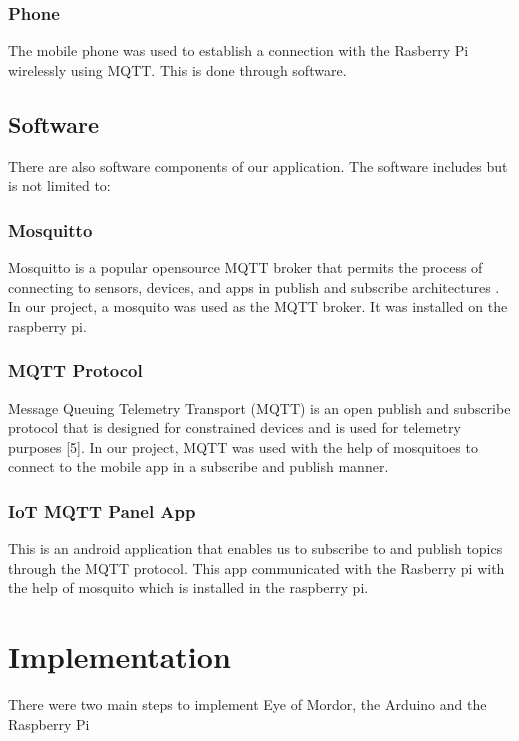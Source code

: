 \documentclass[12pt]{article}
\begin{document}
\subsubsection{Phone}

The mobile phone was used to establish a connection with the Rasberry Pi wirelessly using MQTT. This is done through software.

\subsection{Software} 

There are also software components of our application. The software includes but is not limited to:

\subsubsection{Mosquitto} 

Mosquitto is a popular opensource MQTT broker that permits the process of connecting to sensors, devices, and apps in publish and subscribe architectures \cite{tech4}. In our project, a mosquito was used as the MQTT broker. It was installed on the raspberry pi.

\subsubsection{MQTT Protocol}


Message Queuing Telemetry Transport (MQTT) is an open publish and subscribe protocol that is designed for constrained devices and is used for telemetry purposes [5]. In our project, MQTT was used with the help of mosquitoes to connect to the mobile app in a subscribe and publish manner.

\subsubsection{IoT MQTT Panel App}


This is an android application that enables us to subscribe to and publish topics through the MQTT protocol. This app communicated with the Rasberry pi with the help of mosquito which is installed in the raspberry pi. 

\section{Implementation} \label{sec:implementation}

There were two main steps to implement Eye of Mordor, the Arduino and the Raspberry Pi
\end{document}
